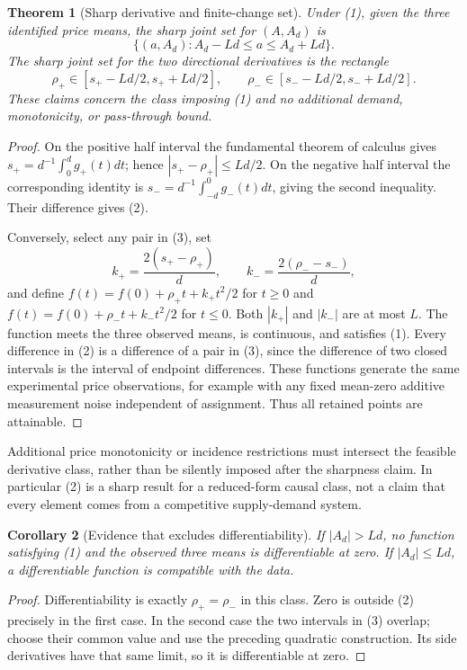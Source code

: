 \documentclass[11pt]{article}
\newtheorem{theorem}{Theorem}
\newtheorem{corollary}[theorem]{Corollary}
\theoremstyle{remark}
\begin{document}
\begin{theorem}[Sharp derivative and finite-change set]
Under (1), given the three identified price means, the sharp joint set for $(A,A_d)$ is
\[
 \bigl\{(a,A_d): A_d-Ld\leq a\leq A_d+Ld\bigr\}.          \tag{2}
\]
The sharp joint set for the two directional derivatives is the rectangle
\[
 \rho_+\in[s_+-Ld/2,s_++Ld/2],\qquad
 \rho_-\in[s_--Ld/2,s_-+Ld/2].                            \tag{3}
\]
These claims concern the class imposing (1) and no additional demand, monotonicity, or pass-through bound.
\end{theorem}
\begin{proof}
On the positive half interval the fundamental theorem of calculus gives
$s_+=d^{-1}\int_0^d g_+(t)dt$; hence $|s_+-\rho_+|\leq Ld/2$. On the negative half interval the corresponding identity is
$s_-=d^{-1}\int_{-d}^0g_-(t)dt$, giving the second inequality. Their difference gives (2).

Conversely, select any pair in (3), set
\[
 k_+=\frac{2(s_+-\rho_+)}d,\qquad
 k_-=\frac{2(\rho_--s_-)}d,
\]
and define $f(t)=f(0)+\rho_+t+k_+t^2/2$ for $t\geq0$ and
$f(t)=f(0)+\rho_-t+k_-t^2/2$ for $t\leq0$.
Both $|k_+|$ and $|k_-|$ are at most $L$. The function meets the three observed means, is continuous, and satisfies (1). Every difference in (2) is a difference of a pair in (3), since the difference of two closed intervals is the interval of endpoint differences. These functions generate the same experimental price observations, for example with any fixed mean-zero additive measurement noise independent of assignment. Thus all retained points are attainable.
\end{proof}

Additional price monotonicity or incidence restrictions must intersect the feasible derivative class, rather than be silently imposed after the sharpness claim. In particular (2) is a sharp result for a reduced-form causal class, not a claim that every element comes from a competitive supply-demand system.

\begin{corollary}[Evidence that excludes differentiability]
If $|A_d|>Ld$, no function satisfying (1) and the observed three means is differentiable at zero. If $|A_d|\leq Ld$, a differentiable function is compatible with the data.
\end{corollary}
\begin{proof}
Differentiability is exactly $\rho_+=\rho_-$ in this class. Zero is outside (2) precisely in the first case. In the second case the two intervals in (3) overlap; choose their common value and use the preceding quadratic construction. Its side derivatives have that same limit, so it is differentiable at zero.
\end{proof}
\end{document}
